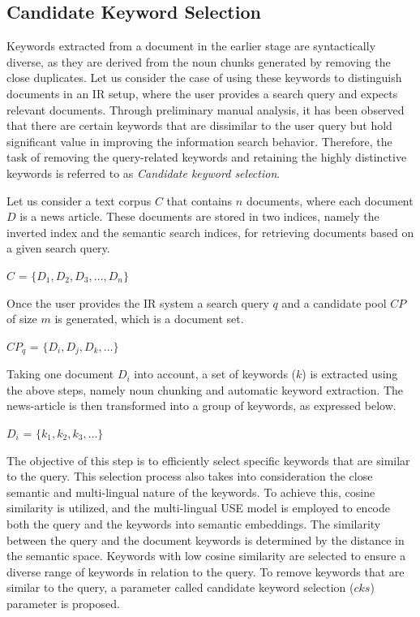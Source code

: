 \subsection{Candidate Keyword Selection}


Keywords extracted from a document in the earlier stage are syntactically diverse, as they are derived from the noun chunks generated by removing the close duplicates. Let us consider the case of using these keywords to distinguish documents in an \ac{IR} setup, where the user provides a search query and expects relevant documents. Through preliminary manual analysis, it has been observed that there are certain keywords that are dissimilar to the user query but hold significant value in improving the information search behavior. Therefore, the task of removing the query-related keywords and retaining the highly distinctive keywords is referred to as \emph{Candidate keyword selection}.


Let us consider a text corpus $C$ that contains $n$ documents, where each document $D$ is a news article. These documents are stored in two indices, namely the inverted index and the semantic search indices, for retrieving documents based on a given search query.


\centerline{$C$ = $\{D_1, D_2, D_3,\dots, D_n\}$}

Once the user provides the IR system a search query $q$ and a candidate pool $CP$ of size $m$ is generated, which is a document set.

\centerline{$CP_q$ = $\{D_i, D_j, D_k,\dots\}$}


Taking one document $D_i$ into account, a set of keywords ($k$) is extracted using the above steps, namely noun chunking and automatic keyword extraction. The news-article is then transformed into a group of keywords, as expressed below.


\centerline{$D_i$ = $\{k_1, k_2, k_3,\dots\}$ } 

The objective of this step is to efficiently select specific keywords that are similar to the query. This selection process also takes into consideration the close semantic and multi-lingual nature of the keywords. To achieve this, cosine similarity is utilized, and the multi-lingual \ac{USE} model is employed to encode both the query and the keywords into semantic embeddings. The similarity between the query and the document keywords is determined by the distance in the semantic space. Keywords with low cosine similarity are selected to ensure a diverse range of keywords in relation to the query. To remove keywords that are similar to the query, a parameter called candidate keyword selection ($cks$) parameter is proposed.

